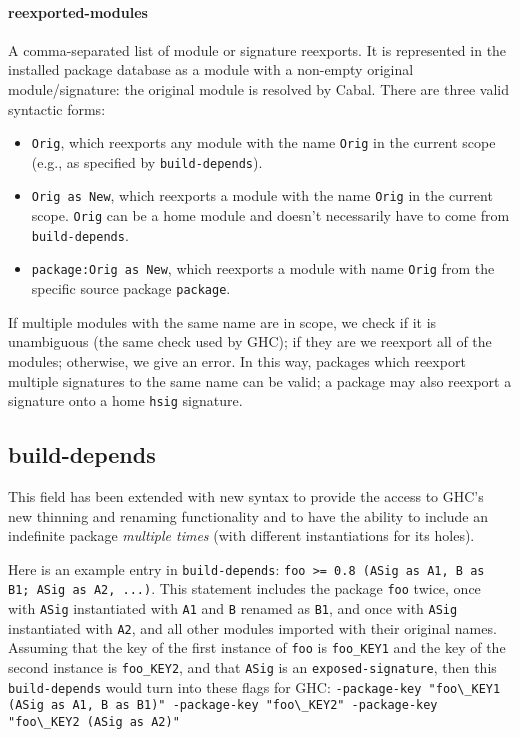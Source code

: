 \documentclass{article}
\begin{document}
\paragraph{reexported-modules}  A comma-separated list of module or
signature reexports.  It is represented in the installed package
database as a module with a non-empty original module/signature: the
original module is resolved by Cabal.  There are three valid syntactic
forms:

\begin{itemize}
    \item \texttt{Orig}, which reexports any module with the
    name \texttt{Orig} in the current scope (e.g.,
    as specified by \texttt{build-depends}).

    \item \texttt{Orig as New}, which reexports a module with
    the name \texttt{Orig} in the current scope.  \texttt{Orig}
    can be a home module and doesn't necessarily have to come
    from \texttt{build-depends}.

    \item \texttt{package:Orig as New}, which reexports a module
    with name \texttt{Orig} from the specific source package \texttt{package}.
\end{itemize}

If multiple modules with the same name are in scope, we check
if it is unambiguous (the same check used by GHC); if they are
we reexport all of the modules; otherwise, we give an error.
In this way, packages which reexport multiple signatures to the
same name can be valid; a package may also reexport a signature
onto a home \texttt{hsig} signature.

\subsection{build-depends}

This field has been extended with new syntax
to provide the access to GHC's new thinning and renaming functionality
and to have the ability to include an indefinite package \emph{multiple times}
(with different instantiations for its holes).

Here is an example entry in \texttt{build-depends}:
\verb|foo >= 0.8 (ASig as A1, B as B1; ASig as A2, ...)|.  This statement includes the
package \texttt{foo} twice, once with \texttt{ASig} instantiated with
\texttt{A1} and \texttt{B} renamed as \texttt{B1}, and once with
\texttt{ASig} instantiated with \texttt{A2}, and all other modules
imported with their original names.  Assuming that the key of the first
instance of \texttt{foo} is \texttt{foo\_KEY1} and the key of the second instance
is \texttt{foo\_KEY2}, and that \texttt{ASig} is an \texttt{exposed-signature}, then this \texttt{build-depends} would turn into
these flags for GHC\@: \verb|-package-key "foo\_KEY1 (ASig as A1, B as B1)" -package-key "foo\_KEY2" -package-key "foo\_KEY2 (ASig as A2)"|
\end{document}

